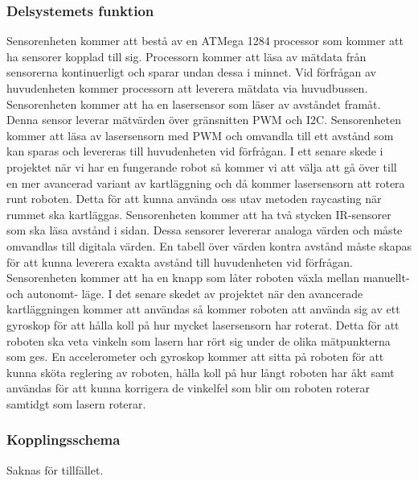 \documentclass{article}
\begin{document}
\subsubsection{Delsystemets funktion}

Sensorenheten kommer att bestå av en ATMega 1284 processor som kommer att ha sensorer kopplad till sig. Processorn kommer att läsa av mätdata från sensorerna kontinuerligt och sparar undan dessa i minnet. Vid förfrågan av huvudenheten kommer processorn att leverera mätdata via huvudbussen. 
\newline\newline
Sensorenheten kommer att ha en lasersensor som läser av avståndet framåt. Denna sensor leverar mätvärden över gränsnitten PWM och I2C. Sensorenheten kommer att läsa av lasersensorn med PWM och omvandla till ett avstånd som kan sparas och levereras till huvudenheten vid förfrågan. I ett senare skede i projektet när vi har en fungerande robot så kommer vi att välja att gå över till en mer avancerad variant av kartläggning och då kommer lasersensorn att rotera runt roboten. Detta för att kunna använda oss utav metoden raycasting när rummet ska kartläggas.
\newline\newline
Sensorenheten kommer att ha två stycken IR-sensorer som ska läsa avstånd i sidan. Dessa sensorer levererar analoga värden och måste omvandlas till digitala värden. En tabell över värden kontra avstånd måste skapas för att kunna leverera exakta avstånd till huvudenheten vid förfrågan. 
\newline\newline
Sensorenheten kommer att ha en knapp som låter roboten växla mellan manuellt- och autonomt- läge.
\newline\newline
I det senare skedet av projektet när den avancerade kartläggningen kommer att användas så kommer roboten att använda sig av ett gyroskop för att hålla koll på hur mycket lasersensorn har roterat. Detta för att roboten ska veta vinkeln som lasern har rört sig under de olika mätpunkterna som ges.
\newline\newline
En accelerometer och gyroskop kommer att sitta på roboten för att kunna sköta reglering av roboten, hålla koll på hur långt roboten har åkt samt användas för att kunna korrigera de vinkelfel som blir om roboten roterar samtidgt som lasern roterar.

\subsubsection{Kopplingsschema}
Saknas för tillfället.
\end{document}
